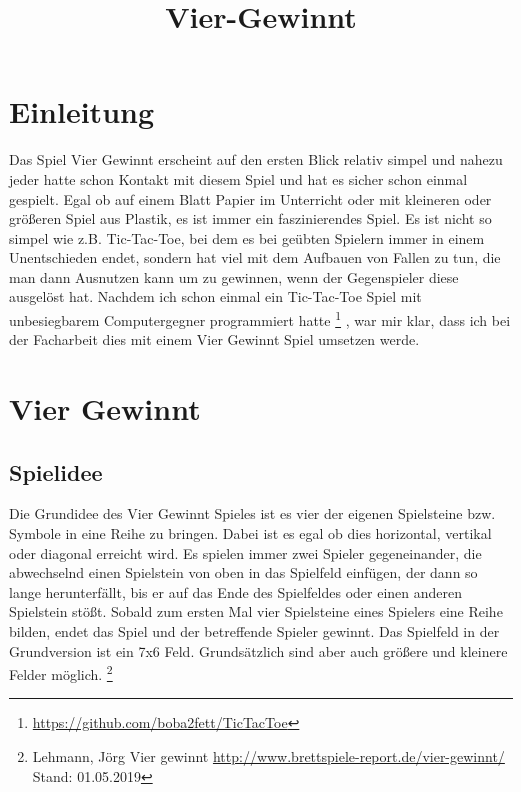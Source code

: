 \documentclass[12pt,a4paper,ngerman]{article}
\title{Vier-Gewinnt}
\author{}
\begin{document}
	\maketitle
	\newpage
	\tableofcontents
	\newpage
	\section{Einleitung}
	Das Spiel Vier Gewinnt erscheint auf den ersten Blick relativ simpel und nahezu jeder hatte schon Kontakt mit diesem Spiel und hat es sicher schon einmal gespielt. Egal ob auf einem Blatt Papier im Unterricht oder mit kleineren oder größeren Spiel aus Plastik, es ist immer ein faszinierendes Spiel. Es ist nicht so simpel wie z.B. Tic-Tac-Toe, bei dem es bei geübten Spielern immer in einem Unentschieden endet, sondern hat viel mit dem Aufbauen von Fallen zu tun, die man dann Ausnutzen kann um zu gewinnen, wenn der Gegenspieler diese ausgelöst hat. Nachdem ich schon einmal ein Tic-Tac-Toe Spiel mit unbesiegbarem Computergegner programmiert hatte
	\footnote{\url{https://github.com/boba2fett/TicTacToe}}
	, war mir klar, dass ich bei der Facharbeit dies mit einem Vier Gewinnt Spiel umsetzen werde.
	\section{Vier Gewinnt}
	\subsection{Spielidee}
	Die Grundidee des \glqq Vier Gewinnt\grqq{} Spieles ist es vier der eigenen Spielsteine bzw. Symbole in eine Reihe zu bringen.
	Dabei ist es egal ob dies horizontal, vertikal oder diagonal erreicht wird.
	Es spielen immer zwei Spieler gegeneinander, die abwechselnd einen Spielstein von oben in das Spielfeld einfügen, der dann so lange herunterfällt, bis er auf das Ende des Spielfeldes oder einen anderen Spielstein stößt.
	Sobald zum ersten Mal vier Spielsteine eines Spielers eine Reihe bilden, endet das Spiel und der betreffende Spieler gewinnt.
	Das Spielfeld in der Grundversion ist ein 7x6 Feld. Grundsätzlich sind aber auch größere und kleinere Felder möglich.
	\footnote{Lehmann, Jörg \glqq Vier gewinnt\grqq{} \url{http://www.brettspiele-report.de/vier-gewinnt/} Stand: 01.05.2019}
\end{document}
